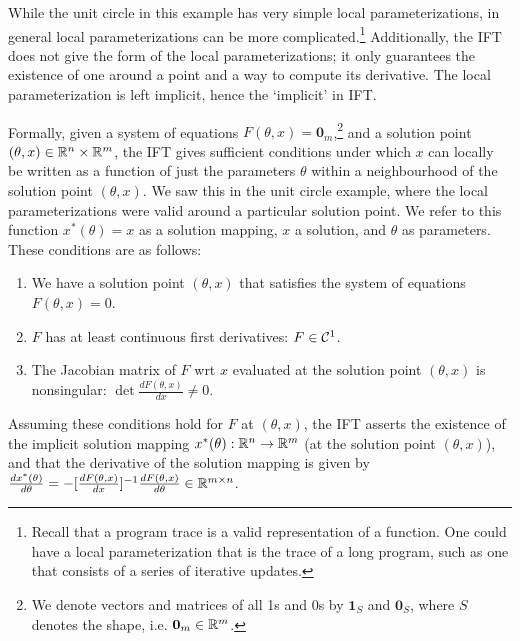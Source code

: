 \documentclass[11pt]{article}
\begin{document}
While the unit circle in this example has very simple local parameterizations,
in general local parameterizations can be more complicated.\footnote{
Recall that a program trace is a valid representation of a function.
One could have a local parameterization that is the trace of a long program,
such as one that consists of a series of iterative updates.
}
Additionally, the IFT does not give the form of the local parameterizations;
it only guarantees the existence of one around a point and a way to compute its derivative.
The local parameterization is left implicit, hence the `implicit' in IFT.

Formally, given a system of equations $F(\theta, x) = \mathbf{0}_m$,\footnote{
We denote vectors and matrices of all 1s and 0s by $\mathbf{1}_S$
and $\mathbf{0}_S$, where $S$ denotes the shape, i.e. $\mathbf{0}_m\in\mathbb{R}^m$.
}
and a solution point $(\theta,x) \in \mathbb{R}^n\times\mathbb{R}^m$,
the IFT gives sufficient conditions under which $x$ can locally be written as a function
of just the parameters $\theta$ within a neighbourhood of the solution point $(\theta,x)$.
We saw this in the unit circle example, where the local parameterizations were
valid around a particular solution point.
We refer to this function $x^*(\theta) = x$ as a solution mapping,
$x$ a solution, and $\theta$ as parameters.
These conditions are as follows:
\begin{enumerate}
\item We have a solution point $(\theta, x)$ that satisfies the system of equations
    $F(\theta, x) = 0$.
\item $F$ has at least continuous first derivatives: $F \in \mathcal{C}^1$.
\item The Jacobian matrix
    of $F$ wrt $x$ evaluated at the solution point $(\theta,x)$ is nonsingular:
    $\det \frac{d F(\theta,x)}{d x} \neq 0$.
\end{enumerate}
Assuming these conditions hold for $F$ at $(\theta,x)$, the IFT
asserts the existence of the implicit solution mapping $x^*(\theta):\mathbb{R}^n\to\mathbb{R}^m$
(at the solution point $(\theta,x)$),
and that the derivative of the solution mapping is given by
$\frac{d x^*(\theta)}{d\theta} = -[\frac{dF(\theta,x)}{dx}]^{-1}
    \frac{d F(\theta,x)}{d\theta} \in \mathbb{R}^{m\times n}$.
\end{document}
